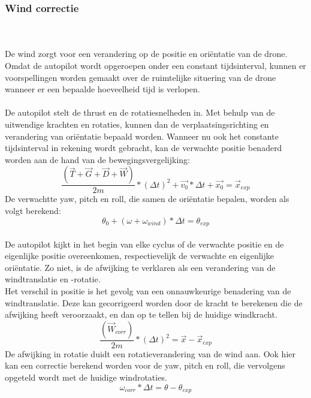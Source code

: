 \subsubsection{Wind correctie}
\\
\\
De wind zorgt voor een verandering op de positie en ori\"entatie van de drone. Omdat de autopilot wordt opgeroepen onder een constant tijdsinterval, kunnen er voorspellingen worden gemaakt over de ruimtelijke situering van de drone wanneer er een bepaalde hoeveelheid tijd is verlopen.
\\
\\
De autopilot stelt de thrust en de rotatiesnelheden in. Met behulp van de uitwendige krachten en rotaties, kunnen dan de verplaatsingsrichting en verandering van ori\"entatie bepaald worden. Wanneer nu ook het constante tijdsinterval in rekening wordt gebracht, kan de verwachte positie benaderd worden aan de hand van de bewegingsvergelijking:
\begin{equation}
	 \frac{(\vec{T} + \vec{G} + \vec{D} + \vec{W}) }{2m} * (\Delta t)^2 + \vec{v_0} * \Delta t + \vec{x_0} = \vec{x}_{exp}
\end{equation}
De verwachtte yaw, pitch en roll, die samen de ori\"entatie bepalen, worden als volgt berekend:
\begin{equation}
	\theta_0 + (\omega + \omega_{wind})*\Delta t = \theta_{exp}
\end{equation}
\\
De autopilot kijkt in het begin van elke cyclus of de verwachte positie en de eigenlijke positie overeenkomen, respectievelijk de verwachte en eigenlijke ori\"entatie. Zo niet, is de afwijking te verklaren als een verandering van de windtranslatie en -rotatie. 
\\
Het verschil in positie is het gevolg van een onnauwkeurige benadering van de windtranslatie. Deze kan gecorrigeerd worden door de kracht te berekenen die de afwijking heeft veroorzaakt, en dan op te tellen bij de huidige windkracht.
\begin{equation}
	\frac{(\vec{W}_{corr}) }{2m} * (\Delta t)^2 = \vec{x}-\vec{x}_{exp}
\end{equation}
De afwijking in rotatie duidt een rotatieverandering van de wind aan. Ook hier kan een correctie berekend worden voor de yaw, pitch en roll, die vervolgens opgeteld wordt met de huidige windrotaties.
\begin{equation}
	\omega_{corr}*\Delta t = \theta-\theta_{exp}
\end{equation}